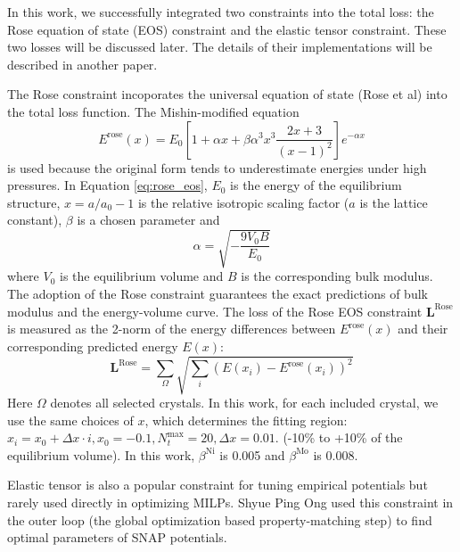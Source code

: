 \documentclass[final,3p,times]{elsarticle}
\begin{document}
In this work, we successfully integrated two constraints into the total loss:
the Rose equation of state (EOS) \cite{Rose0,Rose1,Rose2} constraint and the 
elastic tensor constraint. These two losses will be discussed later. The details 
of their implementations will be described in another paper.

The Rose constraint incoporates the universal equation of state (Rose et al) 
into the total loss function. The Mishin-modified equation 
\begin{equation}
\label{eq:rose_eos}
E^\mathrm{rose}(x) = E_{0}\left[
    1 + \alpha x + \beta \alpha^3 x^3 \frac{2x + 3}{(x - 1)^2} \right]
    e^{-\alpha x}
\end{equation}
is used because the original form tends to underestimate energies under high 
pressures. In Equation \ref{eq:rose_eos}, $E_{0}$ is the energy of the 
equilibrium structure, $x = a / a_{0} - 1$ is the relative isotropic scaling 
factor ($a$ is the lattice constant), $\beta$ is a chosen parameter and 
\begin{equation}
\label{eq:rose_alpha}
\alpha = \sqrt{-\frac{9 V_{0} B }{E_{0}}}
\end{equation}
where $V_0$ is the equilibrium volume and $B$ is the corresponding bulk modulus. 
The adoption of the Rose constraint guarantees the exact predictions of bulk 
modulus and the energy-volume curve. The loss of the Rose EOS constraint 
$\mathbf{L}^{\mathrm{Rose}}$  is measured as the 2-norm of the energy 
differences between $E^{\mathrm{rose}}(x)$ and their corresponding predicted 
energy $E(x)$: 
\begin{equation}
\label{eq:rose_loss}
\mathbf{L}^{\mathrm{Rose}} = \sum_{\Omega}{
    \sqrt{\sum_{i}{\left(E(x_i) - E^{\mathrm{rose}}(x_i)\right)^2}}
}
\end{equation}
Here $\Omega$ denotes all selected crystals. In this work, for each included 
crystal, we use the same choices of $x$, which determines the fitting region: 
$x_{i} = x_{0} + \Delta x \cdot i, x_{0} = -0.1, N_{t}^{\mathrm{max}} = 20, 
\Delta x=0.01$. (-10\% to +10\% of the equilibrium volume). In this work, 
$\beta^{\mathrm{Ni}}$ is 0.005 and $\beta^{\mathrm{Mo}}$ is 0.008.
 
Elastic tensor is also a popular constraint for tuning empirical potentials but 
rarely used directly in optimizing MILPs. Shyue Ping Ong used this constraint in 
the outer loop (the global optimization based property-matching step) to find 
optimal parameters of SNAP potentials. 
\end{document}
